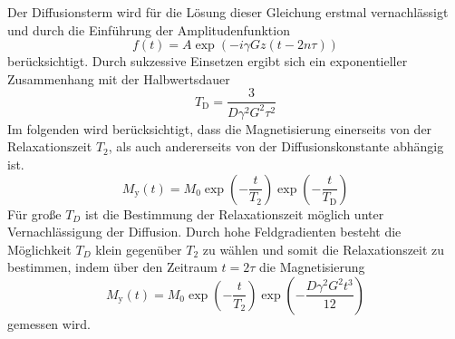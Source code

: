 Der Diffusionsterm wird für die Lösung dieser Gleichung erstmal vernachlässigt 
und durch die Einführung der Amplitudenfunktion 
\begin{equation}
		f(t) = A \exp \left( -i \gamma Gz ( t -2n\tau) \right)
\end{equation}
berücksichtigt. Durch sukzessive Einsetzen ergibt sich ein exponentieller
Zusammenhang mit der Halbwertsdauer
\begin{equation}%
  \label{eq:diffkoef}
  T_\text{D} = \frac{3}{D \gamma^2 G^2 \tau^2}
\end{equation}
Im folgenden wird berücksichtigt, dass die Magnetisierung einerseits von der
Relaxationszeit $T_2$, als auch andererseits von der Diffusionskonstante abhängig ist.
\begin{equation}
		\label{eq:my}
		M_\text{y}(t) = M_0 \exp \left( - \frac{t}{T_2} \right) \exp \left( -
		\frac{t}{T_\text{D}} \right)
\end{equation}
Für große $T_D$ ist die Bestimmung der Relaxationszeit möglich unter
Vernachlässigung der Diffusion. 
Durch hohe Feldgradienten besteht die Möglichkeit $T_D$ klein gegenüber $T_2$
zu wählen und somit die Relaxationszeit zu bestimmen, indem über den Zeitraum 
$t = 2\tau$ die Magnetisierung
\begin{equation}
		\label{eq:magy}
		M_\text{y}(t) = M_0 \exp \left( - \frac{t}{T_2} \right) \exp \left( -
		\frac{D \gamma^2 G^2 t^3}{12} \right)
\end{equation}
gemessen wird.

